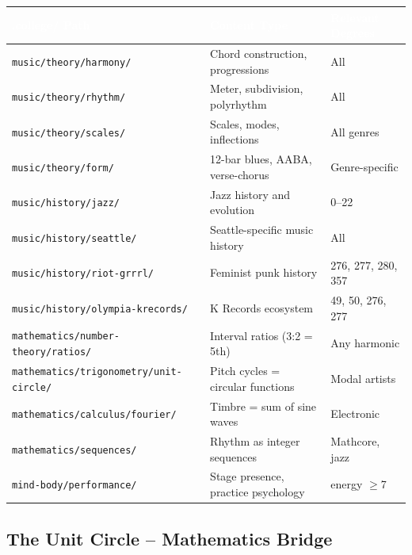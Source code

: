 \documentclass[11pt,letterpaper]{article}
\newcommand{\tblhdr}[1]{\textbf{\sffamily\textcolor{white}{#1}}}
\begin{document}
\begin{center}
\begin{tabularx}{\textwidth}{L{5.5cm}XL{3.5cm}}
\toprule
{}
\tblhdr{.college/ Path} & \tblhdr{Content Type} & \tblhdr{Relevant Degrees} \\
\midrule
\texttt{music/theory/harmony/} & Chord construction, progressions & All \\
\texttt{music/theory/rhythm/} & Meter, subdivision, polyrhythm & All \\
\texttt{music/theory/scales/} & Scales, modes, inflections & All genres \\
\texttt{music/theory/form/} & 12-bar blues, AABA, verse-chorus & Genre-specific \\
\texttt{music/history/jazz/} & Jazz history and evolution & 0--22 \\
\texttt{music/history/seattle/} & Seattle-specific music history & All \\
\texttt{music/history/riot-grrrl/} & Feminist punk history & 276, 277, 280, 357 \\
\texttt{music/history/olympia-krecords/} & K Records ecosystem & 49, 50, 276, 277 \\
\texttt{mathematics/number-theory/ratios/} & Interval ratios (3:2 = 5th) & Any harmonic \\
\texttt{mathematics/trigonometry/unit-circle/} & Pitch cycles = circular functions & Modal artists \\
\texttt{mathematics/calculus/fourier/} & Timbre = sum of sine waves & Electronic \\
\texttt{mathematics/sequences/} & Rhythm as integer sequences & Mathcore, jazz \\
\texttt{mind-body/performance/} & Stage presence, practice psychology & energy $\geq$7 \\
\bottomrule
\end{tabularx}
\end{center}

\subsection{The Unit Circle -- Mathematics Bridge}
\end{document}
